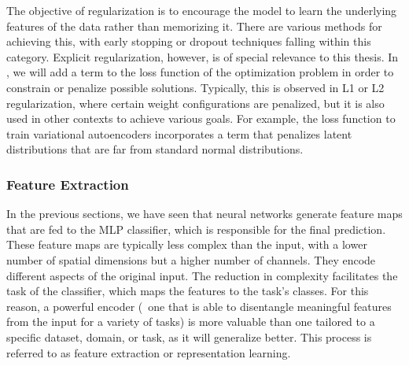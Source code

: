 The objective of regularization is to encourage the model to learn the underlying features of the data rather than memorizing it. There are various methods for achieving this, with early stopping or dropout techniques falling within this category. Explicit regularization, however, is of special relevance to this thesis. In , we will add a term to the loss function of the optimization problem in order to constrain or penalize possible solutions. Typically, this is observed in L1 or L2 regularization, where certain weight configurations are penalized, but it is also used in other contexts to achieve various goals. For example, the loss function to train variational autoencoders incorporates a term that penalizes latent distributions that are far from standard normal distributions.

\subsubsection{Feature Extraction}\label{subsubsec:feature_extraction}
In the previous sections, we have seen that neural networks generate feature maps that are fed to the MLP classifier, which is responsible for the final prediction. These feature maps are typically less complex than the input, with a lower number of spatial dimensions but a higher number of channels. They encode different aspects of the original input. The reduction in complexity facilitates the task of the classifier, which maps the features to the task's classes. For this reason, a powerful encoder (\ie~one that is able to disentangle meaningful features from the input for a variety of tasks) is more valuable than one tailored to a specific dataset, domain, or task, as it will generalize better. This process is referred to as feature extraction or representation learning.

